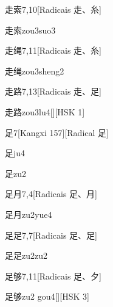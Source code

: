 \begin{entry}{走索}{7,10}[Radicais ⾛、⽷]
  \begin{phonetics}{走索}{zou3suo3}
  \end{phonetics}
\end{entry}

\begin{entry}{走绳}{7,11}[Radicais ⾛、⽷]
  \begin{phonetics}{走绳}{zou3sheng2}
  \end{phonetics}
\end{entry}

\begin{entry}{走路}{7,13}[Radicais ⾛、⾜]
  \begin{phonetics}{走路}{zou3lu4}[][HSK 1]
  \end{phonetics}
\end{entry}

\begin{entry}{足}{7}[Kangxi 157][Radical ⾜]
  \begin{phonetics}{足}{ju4}
  \end{phonetics}
  \begin{phonetics}{足}{zu2}
  \end{phonetics}
\end{entry}

\begin{entry}{足月}{7,4}[Radicais ⾜、⽉]
  \begin{phonetics}{足月}{zu2yue4}
  \end{phonetics}
\end{entry}

\begin{entry}{足足}{7,7}[Radicais ⾜、⾜]
  \begin{phonetics}{足足}{zu2zu2}
  \end{phonetics}
\end{entry}

\begin{entry}{足够}{7,11}[Radicais ⾜、⼣]
  \begin{phonetics}{足够}{zu2 gou4}[][HSK 3]
  \end{phonetics}
\end{entry}

